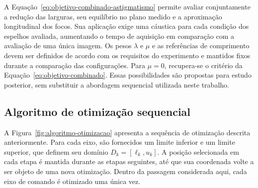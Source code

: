\documentclass[12pt,a4paper]{article}
\makeatletter
\newcommand{\rotulosecao}[2]{%
    \phantomsection
    \def\@currentlabelname{#2}%
    \label{#1}%
}
\makeatother
\begin{document}
A Equação~\ref{eq:objetivo-combinado-astigmatismo} permite avaliar conjuntamente a redução das larguras, seu equilíbrio no plano medido e a aproximação longitudinal dos focos. Sua aplicação exige uma cáustica para cada condição dos espelhos avaliada, aumentando o tempo de aquisição em comparação com a avaliação de uma única imagem. Os pesos $\lambda$ e $\mu$ e as referências de comprimento devem ser definidos de acordo com os requisitos do experimento e mantidos fixos durante a comparação das configurações. Para $\mu=0$, recupera-se o critério da Equação~\ref{eq:objetivo-combinado}. Essas possibilidades são propostas para estudo posterior, sem substituir a abordagem sequencial utilizada neste trabalho.

\subsection*{Algoritmo de otimização sequencial}
\rotulosecao{sec:algoritmo-otimizacao}{Algoritmo de otimização sequencial}

A Figura~\ref{fig:algoritmo-otimizacao} apresenta a sequência de otimização descrita anteriormente. Para cada eixo, são fornecidos um limite inferior e um limite superior, que definem seu domínio $D_k=[\ell_k,u_k]$. A posição selecionada em cada etapa é mantida durante as etapas seguintes, até que sua coordenada volte a ser objeto de uma nova otimização. Dentro da passagem considerada aqui, cada eixo de comando é otimizado uma única vez.
\end{document}
